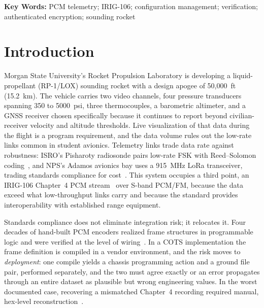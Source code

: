 \documentclass[12pt,letterpaper]{article}
\begin{document}
\noindent\textbf{Key Words:} PCM telemetry; IRIG-106; configuration management;
verification; authenticated encryption; sounding rocket

\section{Introduction}

Morgan State University's Rocket Propulsion Laboratory is developing a liquid-propellant
(RP-1/LOX) sounding rocket with a design apogee of 50{,}000~ft (15.2~km). The vehicle
carries two video channels, four pressure transducers spanning 350 to 5000~psi, three
thermocouples, a barometric altimeter, and a GNSS receiver chosen specifically because it
continues to report beyond civilian-receiver velocity and altitude thresholds. Live
visualization of that data during the flight is a program requirement, and the data volume
rules out the low-rate links common in student avionics. Telemetry links trade data rate
against robustness: ISRO's Pisharoty radiosonde pairs low-rate FSK with Reed--Solomon
coding~\cite{divya2014}, and NPS's Adamos avionics bay uses a 915~MHz LoRa transceiver,
trading standards compliance for cost~\cite{adamos2021}. This system occupies a third
point, an IRIG-106 Chapter~4 PCM stream~\cite{irig106} over S-band PCM/FM, because the
data exceed what low-throughput links carry and because the standard provides
interoperability with established range equipment.

Standards compliance does not eliminate integration risk; it relocates it. Four decades of
hand-built PCM encoders realized frame structures in programmable logic and were verified
at the level of wiring~\cite{rochefort1991,salib2024}. In a COTS implementation the frame
definition is compiled in a vendor environment, and the risk moves to \emph{deployment}:
one compile yields a chassis programming action and a ground file pair, performed
separately, and the two must agree exactly or an error propagates through an entire dataset
as plausible but wrong engineering values. In the worst documented case, recovering a
mismatched Chapter~4 recording required manual, hex-level reconstruction~\cite{rettig2017}.
\end{document}
